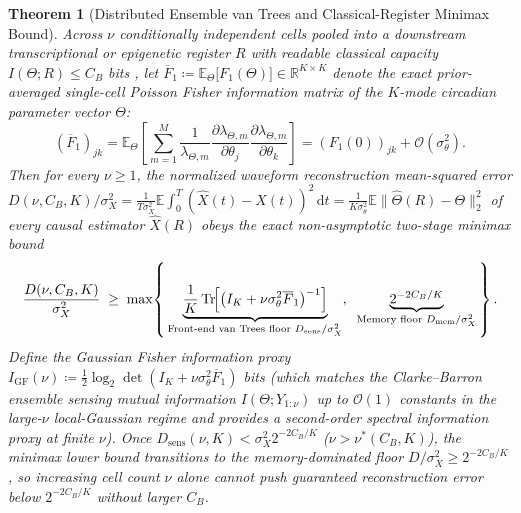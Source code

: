 \documentclass[10pt,letterpaper]{article}
\theoremstyle{plain}
\newtheorem{theorem}{Theorem}
\theoremstyle{definition}
\newcommand{\Rbb}{\mathbb{R}}
\newcommand{\Tr}{\operatorname{Tr}}
\begin{document}
\begin{theorem}[Distributed Ensemble van Trees and Classical-Register Minimax Bound]
\label{thm:rd}
Across $\nu$ conditionally independent cells pooled into a downstream transcriptional or epigenetic register $R$ with readable classical capacity $I(\Theta; R) \le C_B$ bits \cite{barron1999bayes,clarke1999tit,xu2016tit,garcia2026memory}, let $\overline{F}_1 \coloneqq \mathbb{E}_{\Theta}\bigl[F_1(\Theta)\bigr] \in \Rbb^{K \times K}$ denote the exact prior-averaged single-cell Poisson Fisher information matrix of the $K$-mode circadian parameter vector $\Theta$:
\begin{equation}
    (\overline{F}_1)_{jk} = \mathbb{E}_{\Theta}\!\left[\sum_{m=1}^{M} \frac{1}{\lambda_{\Theta,m}} \frac{\partial \lambda_{\Theta,m}}{\partial \theta_j}\frac{\partial \lambda_{\Theta,m}}{\partial \theta_k}\right] = (F_1(0))_{jk} + \mathcal{O}(\sigma_\theta^2).
    \label{eq:fisher1}
\end{equation}
Then for every $\nu \ge 1$, the normalized waveform reconstruction mean-squared error $D(\nu, C_B, K)/\sigma_X^2 = \frac{1}{T\sigma_X^2}\mathbb{E}\int_0^T (\widehat{X}(t) - X(t))^2\,\mathrm{d}t = \frac{1}{K\sigma_\theta^2}\mathbb{E}\|\widehat{\Theta}(R) - \Theta\|_2^2$ of every causal estimator $\widehat{X}(R)$ obeys the exact non-asymptotic two-stage minimax bound
\begin{equation}
    \frac{D(\nu, C_B, K)}{\sigma_X^2} \;\ge\; \max\!\left\{\,
    \underbrace{\frac{1}{K}\Tr\!\Bigl[\bigl(I_K + \nu\sigma_\theta^2 \overline{F}_1\bigr)^{-1}\Bigr]}_{\text{Front-end van Trees floor } D_{\mathrm{sens}}/\sigma_X^2},\;\;
    \underbrace{2^{-2 C_B / K}}_{\text{Memory floor } D_{\mathrm{mem}}/\sigma_X^2}
    \,\right\}.
    \label{eq:twostage}
\end{equation}
Define the Gaussian Fisher information proxy $I_{\mathrm{GF}}(\nu) \coloneqq \frac{1}{2}\log_2 \det(I_K + \nu\sigma_\theta^2 \overline{F}_1)$ bits (which matches the Clarke--Barron ensemble sensing mutual information $I(\Theta; Y_{1:\nu})$ up to $\mathcal{O}(1)$ constants in the large-$\nu$ local-Gaussian regime and provides a second-order spectral information proxy at finite $\nu$). Once $D_{\mathrm{sens}}(\nu, K) < \sigma_X^2 2^{-2C_B/K}$ ($\nu > \nu^*(C_B, K)$), the minimax lower bound transitions to the memory-dominated floor $D/\sigma_X^2 \ge 2^{-2C_B/K}$, so increasing cell count $\nu$ alone cannot push guaranteed reconstruction error below $2^{-2C_B/K}$ without larger $C_B$.
\end{theorem}
\end{document}

